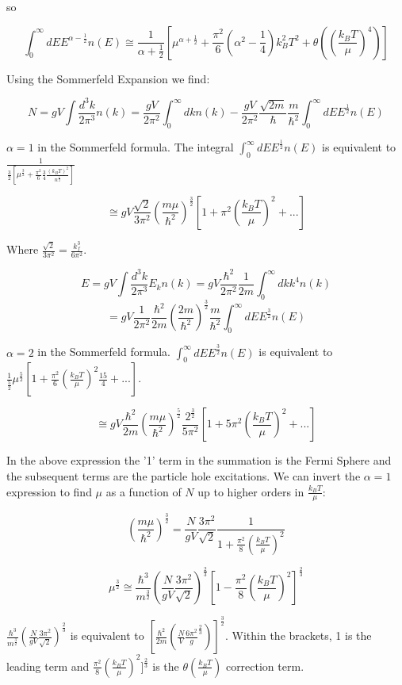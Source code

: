 \documentclass{article}
\newcommand{\bltz}{k_{B}}
\newcommand{\dtk}{\frac{d^{3}k}{2\pi^{3}}}
\newcommand{\qmom}{\frac{\hbar^{2}}{2m}}
\begin{document}
so

$$\int_{0}^{\infty}dEE^{\alpha-\frac{1}{2}}n(E)\cong\frac{1}{\alpha+\frac{1}{2}}[\mu^{\alpha+\frac{1}{2}}+\frac{\pi^{2}}{6}(\alpha^{2}-\frac{1}{4})\bltz^{2}T^{2}+\theta((\frac{\bltz T}{\mu})^{4})]$$


Using the Sommerfeld Expansion we find:

$$N=gV\int\dtk n(k)=\frac{gV}{2\pi^{2}}\int_{0}^{\infty}dkn(k)-\frac{gV}{2\pi^{2}}\frac{\sqrt{2m}}{\hbar}\frac{m}{\hbar^{2}}\int_{0}^{\infty}dEE^{\frac{1}{2}}n(E)$$

$\alpha=1$ in the Sommerfeld formula.  The integral $ \int_{0}^{\infty}dEE^{\frac{1}{2}}n(E)$ is equivalent to $\frac{1}{\frac{3}{2}[\mu^{\frac{3}{2}}+\frac{\pi^{2}}{6}\frac{3}{4}\frac{(\bltz T)^{2}}{n^{\frac{1}{2}}}]}$

$$\cong gV\frac{\sqrt{2}}{3\pi^{2}}(\frac{m\mu}{\hbar^{2}})^{\frac{3}{2}}[1+\pi^{2}(\frac{\bltz T}{\mu})^{2}+...]$$

Where $\frac{\sqrt{2}}{3\pi^{2}}=\frac{k_{f}^{3}}{6\pi^{2}}$.

$$E=gV\int\dtk E_{k}n(k)=gV\frac{\hbar^{2}}{2\pi^{2}}\frac{1}{2m}\int_{0}^{\infty}dkk^{4}n(k)$$
$$=gV\frac{1}{2\pi^{2}}\qmom(\frac{2m}{\hbar^{2}})^{\frac{3}{2}}\frac{m}{\hbar^{2}}\int_{0}^{\infty}dEE^{\frac{3}{2}}n(E)$$

$\alpha=2$ in the Sommerfeld formula.  $\int_{0}^{\infty}dEE^{\frac{3}{2}}n(E)$ is equivalent to $\frac{1}{\frac{5}{2}}\mu^{\frac{5}{2}}[1+\frac{\pi^{2}}{6}(\frac{\bltz T}{\mu})^{2}\frac{15}{4}+...]$.

$$\cong gV\qmom(\frac{m\mu}{\hbar^{2}})^{\frac{5}{2}}\frac{2^{\frac{3}{2}}}{5\pi^{2}}[1+5\pi^{2}(\frac{\bltz T}{\mu})^{2}+...]$$

In the above expression the '1' term in the summation is the Fermi Sphere and the subsequent terms are the particle hole excitations.  We can invert the $\alpha=1$ expression to find $\mu$ as a function of $N$ up to higher orders in $\frac{\bltz T}{\mu}$:

$$(\frac{m\mu}{\hbar^{2}})^{\frac{3}{2}}=\frac{N}{gV}\frac{3\pi^{2}}{\sqrt{2}}\frac{1}{1+\frac{\pi^{2}}{8}(\frac{\bltz T}{\mu})^{2}}$$

$$\mu^{\frac{3}{2}}\cong\frac{\hbar^{3}}{m^{\frac{3}{2}}}(\frac{N}{gV}\frac{3\pi^{2}}{\sqrt{2}})^{\frac{2}{3}}[1-\frac{\pi^{2}}{8}(\frac{\bltz T}{\mu})^{2}]^{\frac{2}{3}}$$

$\frac{\hbar^{3}}{m^{\frac{3}{2}}}(\frac{N}{gV}\frac{3\pi^{2}}{\sqrt{2}})^{\frac{2}{3}}$ is equivalent to $[\qmom(\frac{N}{V}\frac{6\pi^{2}}{g}^{\frac{2}{3}})]^{\frac{3}{2}}$.  Within the brackets, 1 is the leading term and $\frac{\pi^{2}}{8}(\frac{\bltz T}{\mu})^{2}]^{\frac{2}{3}}$ is the $\theta(\frac{\bltz T}{\mu})$ correction term.
\end{document}
